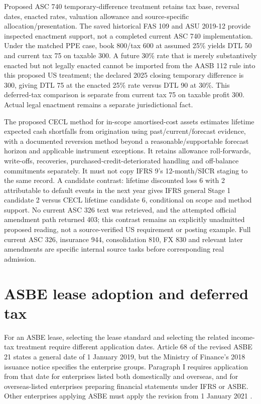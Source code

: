 Proposed ASC 740 temporary-difference treatment retains tax base, reversal dates, enacted rates, valuation allowance and source-specific allocation/presentation. The saved historical FAS 109 and ASU 2019-12 provide inspected enactment support, not a completed current ASC 740 implementation. Under the matched PPE case, book 800/tax 600 at assumed 25\% yields DTL 50 and current tax 75 on taxable 300. A future 30\% rate that is merely substantively enacted but not legally enacted cannot be imported from the AASB 112 rule into this proposed US treatment; the declared 2025 closing temporary difference is 300, giving DTL 75 at the enacted 25\% rate versus DTL 90 at 30\%. This deferred-tax comparison is separate from current tax 75 on taxable profit 300. Actual legal enactment remains a separate jurisdictional fact.

The proposed CECL method for in-scope amortised-cost assets estimates lifetime expected cash shortfalls from origination using past/current/forecast evidence, with a documented reversion method beyond a reasonable/supportable forecast horizon and applicable instrument exceptions. It retains allowance roll-forwards, write-offs, recoveries, purchased-credit-deteriorated handling and off-balance commitments separately. It must not copy IFRS 9's 12-month/SICR staging to the same record. A candidate contrast: lifetime discounted loss 6 with 2 attributable to default events in the next year gives IFRS general Stage 1 candidate 2 versus CECL lifetime candidate 6, conditional on scope and method support. No current ASC 326 text was retrieved, and the attempted official amendment path returned 403; this contrast remains an explicitly unadmitted proposed reading, not a source-verified US requirement or posting example. Full current ASC 326, insurance 944, consolidation 810, FX 830 and relevant later amendments are specific internal source tasks before corresponding real admission.

\hypertarget{asbe-official-lease-support-and-remaining-tax-sources}{%
\section{ASBE lease adoption and deferred tax}\label{method-standards-methods-asbe-official-lease-support-and-remaining-tax-sources}}

For an ASBE lease, selecting the lease standard and selecting the related income-tax treatment require different application dates. Article 68 of the revised ASBE 21 states a general date of 1 January 2019, but the Ministry of Finance's 2018 issuance notice specifies the enterprise groups. Paragraph I requires application from that date for enterprises listed both domestically and overseas, and for overseas-listed enterprises preparing financial statements under IFRS or ASBE. Other enterprises applying ASBE must apply the revision from 1 January 2021 \citep[issuance notice, para.\ I]{moflease2018}.

